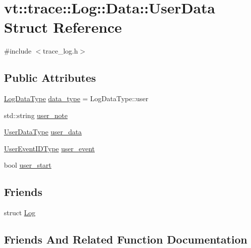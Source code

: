 \hypertarget{structvt_1_1trace_1_1_log_1_1_data_1_1_user_data}{}\section{vt\+:\+:trace\+:\+:Log\+:\+:Data\+:\+:User\+Data Struct Reference}
\label{structvt_1_1trace_1_1_log_1_1_data_1_1_user_data}


{\ttfamily \#include $<$trace\+\_\+log.\+h$>$}

\subsection*{Public Attributes}
\begin{DoxyCompactItemize}
\item 
\hyperlink{structvt_1_1trace_1_1_log_ae1c08093fd18967b7d4912d04d6acc3d}{Log\+Data\+Type} \hyperlink{structvt_1_1trace_1_1_log_1_1_data_1_1_user_data_a74f45e93662407f9b432a640807472c9}{data\+\_\+type} = Log\+Data\+Type\+::user
\item 
std\+::string \hyperlink{structvt_1_1trace_1_1_log_1_1_data_1_1_user_data_a14f69beb263080bf4fd0872fafcf4b6c}{user\+\_\+note}
\item 
\hyperlink{structvt_1_1trace_1_1_log_af392c3825bf45d286a0f77bddf7a96cf}{User\+Data\+Type} \hyperlink{structvt_1_1trace_1_1_log_1_1_data_1_1_user_data_ade431a285a79e18cfe816f03d1ae7285}{user\+\_\+data}
\item 
\hyperlink{namespacevt_1_1trace_a5908920d051c144c89f17c69ed262350}{User\+Event\+I\+D\+Type} \hyperlink{structvt_1_1trace_1_1_log_1_1_data_1_1_user_data_a00002c986ccb5d7e267eecfad00941fc}{user\+\_\+event}
\item 
bool \hyperlink{structvt_1_1trace_1_1_log_1_1_data_1_1_user_data_a99efa647964217841ba1862f07b00868}{user\+\_\+start}
\end{DoxyCompactItemize}
\subsection*{Friends}
\begin{DoxyCompactItemize}
\item 
struct \hyperlink{structvt_1_1trace_1_1_log_1_1_data_1_1_user_data_add132ae9df1b7ef820c8082c32b0f839}{Log}
\end{DoxyCompactItemize}


\subsection{Friends And Related Function Documentation}
\mbox{\label{structvt_1_1trace_1_1_log_1_1_data_1_1_user_data_add132ae9df1b7ef820c8082c32b0f839}} 
